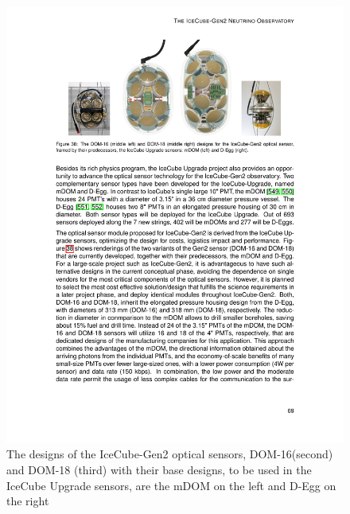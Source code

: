 \begin{figure}
	\includegraphics[scale=2.2]{./figures/gen2/Gen2_DOMs.pdf}
	\caption{The designs of the IceCube-Gen2 optical sensors, DOM-16(second) and DOM-18 (third) with their base designs, to be used in the IceCube Upgrade sensors, are the mDOM on the left and D-Egg on the right \cite{Gen2_TDR}}
\end{figure}




